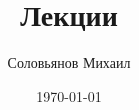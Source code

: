 \documentclass[a4paper,12pt]{article} %
\author{Соловьянов Михаил }
\title{Лекции}
\date{\today}
\begin{document}

\Rus

\tableofcontents



















\end{document}
